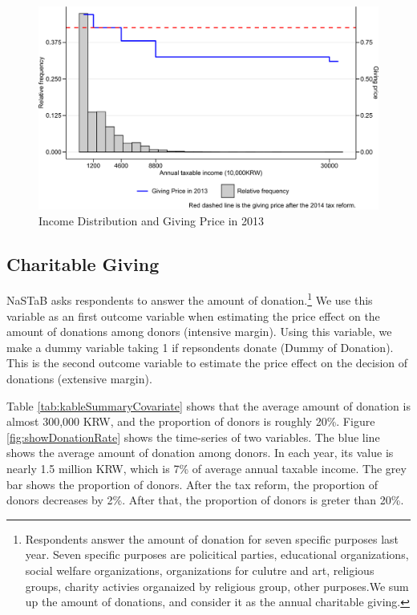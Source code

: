 \documentclass[ review  , 3p ]{elsarticle}
\begin{document}
  \begin{figure}[t]

  {\centering \includegraphics[width=0.9\linewidth]{draft_files/figure-latex/SummaryPriceChange-1} 

  }

  \caption{Income Distribution and Giving Price in 2013}\label{fig:SummaryPriceChange}
  \end{figure}

  \hypertarget{charitable-giving}{%
  \subsection{Charitable Giving}\label{charitable-giving}}

  NaSTaB asks respondents to answer the amount of donation.\footnote{Respondents answer the amount of donation for seven specific purposes last year. Seven specific purposes are policitical parties, educational organizations, social welfare organizations, organizations for culutre and art, religious groups, charity activies organaized by religious group, other purposes.We sum up the amount of donations, and consider it as the annual charitable giving.}
  We use this variable as an first outcome variable when
  estimating the price effect on the amount of donations among donors (intensive margin).
  Using this variable, we make a dummy variable taking 1 if repsondents donate (Dummy of Donation).
  This is the second outcome variable
  to estimate the price effect on the decision of donations (extensive margin).

  Table \ref{tab:kableSummaryCovariate} shows that
  the average amount of donation is almost 300,000 KRW,
  and the proportion of donors is roughly 20\%.
  Figure \ref{fig:showDonationRate} shows the time-series of two variables.
  The blue line shows the average amount of donation among donors.
  In each year, its value is nearly 1.5 million KRW,
  which is 7\% of average annual taxable income.
  The grey bar shows the proportion of donors.
  After the tax reform, the proportion of donors decreases by 2\%.
  After that, the proportion of donors is greter than 20\%.
\end{document}
